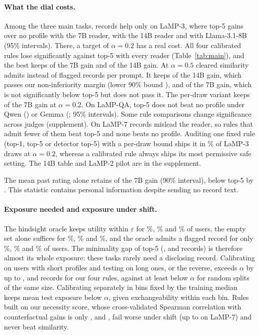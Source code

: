 \paragraph{What the dial costs.}
Among the three main tasks, records help only on LaMP-3, where top-5 gains \threeTopFiveGain{} over no
profile with the 7B reader, \FourteenGain{} with the 14B reader and
\threeLlamaGain{} with Llama-3.1-8B (95\% intervals). There, a target of
$\alpha=0.2$ has a real cost. All four calibrated rules lose significantly
against top-5 with every reader (Table~\ref{tab:main}), and the best keeps
\threeSimThrKeptB{} of the 7B gain and \FourteenCSimKeptB{} of the 14B
gain. At $\alpha=0.5$ cleared similarity admits \FourteenCSimExpoD{} instead of
\FourteenESimK{} flagged records per prompt. It keeps \FourteenCSimKeptD{} of
the 14B gain, which passes our non-inferiority margin (lower 90\% bound
\FourteenCSimKeptLowD{}), and \threeCSimKeptD{} of the 7B gain, which is not
significantly below top-5 but does not pass it. The per-draw variant keeps \threeLttSimThrKeptB{} of the 7B gain at
$\alpha=0.2$. On LaMP-QA, top-5 does not beat no profile under Qwen (\SecondJudgeQwenGain{})
or Gemma (\SecondJudgeGain{}; 95\% intervals). Some rule comparisons
change significance across judges (supplement). On LaMP-7 records mislead the reader, so
rules that admit fewer of them beat top-5 and none beats no profile. Auditing one fixed rule (top-1, top-5 or detector top-5) with a per-draw
bound ships it in \threeFixLttDep\% of LaMP-3 draws at $\alpha=0.2$, whereas a
calibrated rule always ships its most permissive safe setting. The 14B table and LaMP-2 pilot are in the supplement.

The mean past rating alone retains \MeanRatingKept{} of the 7B gain
(90\% interval), below top-5 by \MeanRatingDelta{}.
This statistic contains personal information despite sending no record text.

\paragraph{Exposure needed and exposure under shift.}
The hindsight oracle keeps utility within $\varepsilon$ for \qaOrSuff\%,
\threeOrSuff\% and \sevenOrSuff\% of users, the empty set alone suffices for
\qaOrEmpty\%, \threeOrEmpty\% and \sevenOrEmpty\%, and the oracle admits a
flagged record for only \qaOrNeeds\%, \threeOrNeeds\% and \sevenOrNeeds\% of
users. The minimality gap of top-5 (\qaOrSimKGap{}, \threeOrSimKGap{} and
\sevenOrSimKGap{} records) is therefore almost its whole exposure: these
tasks rarely need a disclosing record. Calibrating on users with short profiles and testing on long ones, or the
reverse, exceeds $\alpha$ by up to \qaShiftMain{}, \threeShiftMain{} and
\sevenShiftMain{} records for our four rules, against at least
\qaShiftRand{} below $\alpha$ for random splits of the same size. Calibrating
separately in bins fixed by the training median keeps mean test exposure
below $\alpha$, given exchangeability within each bin. Rules
built on our necessity score, whose cross-validated Spearman correlation with
counterfactual gains is only \qaNecSpearman{}, \threeNecSpearman{} and
\sevenNecSpearman{}, fail worse under shift (up to \sevenShiftNec{} on
LaMP-7) and never beat similarity.

